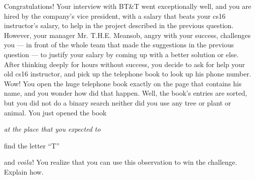 Congratulations! Your interview with BT\&T    went exceptionally well, and you are
hired by the company's vice president, with a salary that beats your cs16
instructor's salary, to help in the project described in the previous question.
However, your manager Mr. T.H.E. Meansob, angry with your success, challenges
you --- in front of the whole team that made the suggestions in the previous
question --- to justify your salary by coming up with a better solution or
else. After thinking deeply for hours without success, you decide to ask for
help your old cs16 instructor, and pick up the telephone book to look up his
phone number. Wow! You open the huge telephone book exactly on the page that
contains his name, and you wonder how did that happen. Well, the book's entries
are sorted, but you did not do a binary search neither did you use any tree or
plant or animal. You just opened the book {\em at the place that you expected to

find the letter ``T''} and
$voila!$ You realize that you can use this observation to win the challenge.
Explain how.




